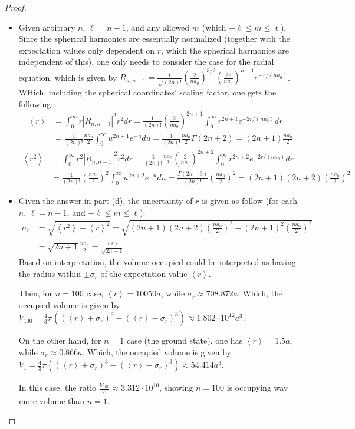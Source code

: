 \documentclass{article}
\begin{document}
\begin{proof}
\begin{itemize}
    \item[(d)] Given arbitrary $n$, $\ell=n-1$, and any allowed $m$ (which $-\ell \leq m\leq \ell$). Since the spherical harmonics are essentially normalized (together with the expectation values only dependent on $r$, which the spherical harmonics are independent of this), one only needs to consider the case for the radial equation, which is given by $R_{n,n-1} = \frac{1}{\sqrt{(2n)!}}\left(\frac{2}{na_0}\right)^{3/2}\left(\frac{2r}{na_0}\right)^{n-1}e^{-r/(na_0)}$. WHich, including the spherical coordinates' scaling factor, one gets the following:
    \begin{align}
        \left<r\right>&=\int_{0}^{\infty}r |R_{n,n-1}|^2 r^2 dr = \frac{1}{(2n)!}\left(\frac{2}{na_0}\right)^{2n+1}\int_{0}^{\infty}r^{2n+1}e^{-2r/(na_0)}dr\\
        &= \frac{1}{(2n)!}\frac{na_0}{2}\int_{0}^{\infty}u^{2n+1}e^{-u}du = \frac{1}{(2n)!}\frac{na_0}{2}\Gamma(2n+2) = (2n+1)\frac{na_0}{2}
    \end{align}
    \begin{align}
        \left<r^2\right> &= \int_{0}^{\infty}r^2|R_{n,n-1}|^2 r^2dr = \frac{1}{(2n)!}\frac{na_0}{2}\left(\frac{2}{na_0}\right)^{2n+2}\int_{0}^{\infty}r^{2n+2}e^{-2r/(na_0)}dr\\
        &= \frac{1}{(2n)!}\left(\frac{na_0}{2}\right)^2\int_{0}^{\infty}u^{2n+2}e^{-u}du = \frac{\Gamma(2n+3)}{(2n)!}\left(\frac{na_0}{2}\right)^2 = (2n+1)(2n+2)\left(\frac{na_0}{2}\right)^2
    \end{align}

    \hfil

    \item[(e)] Given the answer in part (d), the uncertainty of $r$ is given as follow (for each $n$, $\ell=n-1$, and $-\ell\leq m\leq \ell$):
    \begin{align}
        \sigma_r &= \sqrt{\left<r^2\right>-\left<r\right>^2} = \sqrt{(2n+1)(2n+2)\left(\frac{na_0}{2}\right)^2 - (2n+1)^2\left(\frac{na_0}{2}\right)^2}\\
        &= \sqrt{2n+1}\frac{na_0}{2} = \frac{\left<r\right>}{\sqrt{2n+1}}
    \end{align}
    Based on interpretation, the volume occupied could be interpreted as having the radius within $\pm \sigma_r$ of the expectation value $\left<r\right>$.

    Then, for $n=100$ case, $\left<r\right> = 10050a$, while $\sigma_r \approx 708.872 a$. Which, the occupied volume is given by $V_{100}=\frac{4}{3}\pi\left((\left<r\right>+\sigma_r)^3-\left(\left<r\right>-\sigma_r\right)^3\right) \approx 1.802\cdot 10^{12} a^3$.

    On the other hand, for $n=1$ case (the ground state), one has $\left<r\right> = 1.5 a$, while $\sigma_r \approx 0.866 a$. Which, the occupied volume is given by $V_1=\frac{4}{3}\pi\left((\left<r\right>+\sigma_r)^3-\left(\left<r\right>-\sigma_r\right)^3\right) \approx 54.414 a^3 $.

    In this case, the ratio $\frac{V_{100}}{V_1} \approx 3.312 \cdot 10^{10}$, showing $n=100$ is occupying way more volume than $n=1$.
    \end{itemize}
\end{proof}
\end{document}
